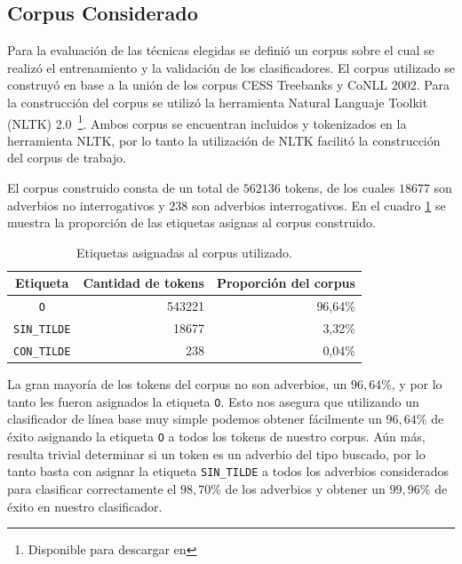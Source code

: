 \documentclass[runningheads,a4paper]{llncs}
\begin{document}
\subsection{Corpus Considerado}
Para la evaluación de las técnicas elegidas se definió un corpus sobre el cual se realizó el entrenamiento y la validación de los clasificadores. El corpus utilizado se construyó en base a la unión de los corpus CESS Treebanks y CoNLL 2002. Para la construcción del corpus se utilizó la herramienta Natural Languaje Toolkit (NLTK) 2.0~\footnote{Disponible para descargar en \nltk}. Ambos corpus se encuentran incluidos y tokenizados en la herramienta NLTK, por lo tanto la utilización de NLTK facilitó la construcción del corpus de trabajo.

El corpus construido consta de un total de $562136$ tokens, de los cuales $18677$ son adverbios no interrogativos y $238$ son adverbios interrogativos. En el cuadro \ref{table:corpus} se muestra la proporci\'on de las etiquetas asignas al corpus construido.


\begin{table}[ht]
 	\renewcommand{\arraystretch}{1.3}
	\renewcommand{\tabcolsep}{3pt}
	\caption{Etiquetas asignadas al corpus utilizado.}
	\label{table:corpus}
	\centering
	\begin{tabular}{c r r}
		\hline\hline
		\multicolumn{1}{c}{\textbf{Etiqueta}} & \multicolumn{1}{c}{\textbf{Cantidad de tokens}} & \multicolumn{1}{c}{\textbf{Proporci\'on del corpus}} \\
		\hline
		\texttt{O} & 543221 & 96,64\% \\
		\texttt{SIN\_TILDE} & 18677 & 3,32\% \\
		\texttt{CON\_TILDE} & 238 & 0,04\% \\
		\hline
	\end{tabular}
\end{table}

La gran mayoría de los tokens del corpus no son adverbios, un $96,64\%$, y por lo tanto les fueron asignados la etiqueta \texttt{\small O}. Esto nos asegura que utilizando un clasificador de línea base muy simple podemos obtener fácilmente un $96,64\%$ de \'exito asignando la etiqueta \texttt{\small O} a todos los tokens de nuestro corpus. A\'un m\'as, resulta trivial determinar si un token es un adverbio del tipo buscado, por lo tanto basta con asignar la etiqueta \texttt{\small SIN\_TILDE} a todos los adverbios considerados para clasificar correctamente el $98,70\%$ de los adverbios y obtener un $99,96\%$ de \'exito en nuestro clasificador.
\end{document}
